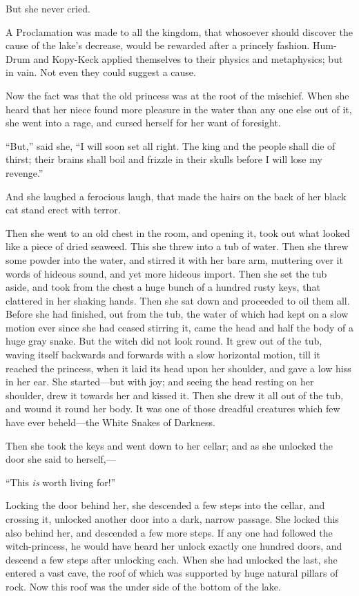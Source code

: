 \documentclass[12pt]{memoir}
\begin{document}
But she never cried.

A Proclamation was made to all the kingdom, that whosoever should
discover the cause of the lake's decrease, would be rewarded after a
princely fashion.  Hum-Drum and Kopy-Keck applied themselves to their
physics and metaphysics; but in vain.  Not even they could suggest a
cause.

Now the fact was that the old princess was at the root of the
mischief.  When she heard that her niece found more pleasure in the
water than any one else out of it, she went into a rage, and cursed
herself for her want of foresight.

``But,'' said she, ``I will soon set all right.  The king and the
people shall die of thirst; their brains shall boil and frizzle in
their skulls before I will lose my revenge.''

And she laughed a ferocious laugh, that made the hairs on the back of
her black cat stand erect with terror.

Then she went to an old chest in the room, and opening it, took out
what looked like a piece of dried seaweed.  This she threw into a tub
of water.  Then she threw some powder into the water, and stirred it
with her bare arm, muttering over it words of hideous sound, and yet
more hideous import.  Then she set the tub aside, and took from the
chest a huge bunch of a hundred rusty keys, that clattered in her
shaking hands.  Then she sat down and proceeded to oil them all.
Before she had finished, out from the tub, the water of which had kept
on a slow motion ever since she had ceased stirring it, came the head
and half the body of a huge gray snake.  But the witch did not look
round.  It grew out of the tub, waving itself backwards and forwards
with a slow horizontal motion, till it reached the princess, when it
laid its head upon her shoulder, and gave a low hiss in her ear.  She
started---but with joy; and seeing the head resting on her shoulder,
drew it towards her and kissed it.  Then she drew it all out of the
tub, and wound it round her body.  It was one of those dreadful
creatures which few have ever beheld---the White Snakes of Darkness.

Then she took the keys and went down to her cellar; and as she
unlocked the door she said to herself,---

``This \emph{is} worth living for!''

Locking the door behind her, she descended a few steps into the
cellar, and crossing it, unlocked another door into a dark, narrow
passage.  She locked this also behind her, and descended a few more
steps.  If any one had followed the witch-princess, he would have
heard her unlock exactly one hundred doors, and descend a few steps
after unlocking each.  When she had unlocked the last, she entered a
vast cave, the roof of which was supported by huge natural pillars of
rock.  Now this roof was the under side of the bottom of the lake.
\end{document}
